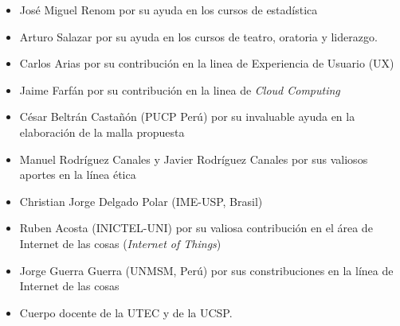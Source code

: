 \begin{itemize}
\item José Miguel Renom por su ayuda en los cursos de estadística
\item Arturo Salazar por su ayuda en los cursos de teatro, oratoria y liderazgo.
\item Carlos Arias por su contribución en la linea de Experiencia de Usuario (UX)
\item Jaime Farfán por su contribución en la linea de \textit{Cloud Computing}
\item César Beltrán Castañón (PUCP Perú) por su invaluable ayuda en la elaboración de la malla propuesta
\item Manuel Rodríguez Canales y Javier Rodríguez Canales por sus valiosos aportes en la línea ética
\item Christian Jorge Delgado Polar (IME-USP, Brasil)
\item Ruben Acosta (INICTEL-UNI) por su valiosa contribución en el área de Internet de las cosas (\textit{Internet of Things})
\item Jorge Guerra Guerra (UNMSM, Perú) por sus constribuciones en la línea de Internet de las cosas
\item Cuerpo docente de la UTEC y de la UCSP.
\end{itemize}

